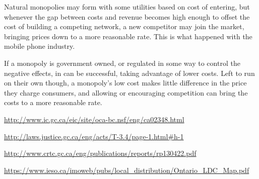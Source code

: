 \documentclass{article}
\begin{document}
Natural monopolies may form with some utilities based on cost of entering, but whenever the gap between costs and revenue becomes high enough to offset the cost of building a competing network, a new competitor may join the market, bringing prices down to a more reasonable rate. This is what happened with the mobile phone industry.

If a monopoly is government owned, or regulated in some way to control the negative effects, in can be successful, taking advantage of lower costs. Left to run on their own though, a monopoly's low cost makes little difference in the price they charge consumers, and allowing or encouraging competition can bring the costs to a more reasonable rate.

\url{http://www.ic.gc.ca/eic/site/oca-bc.nsf/eng/ca02348.html}


\url{http://laws.justice.gc.ca/eng/acts/T-3.4/page-1.html#h-1}

\url{http://www.crtc.gc.ca/eng/publications/reports/rp130422.pdf}

\url{https://www.ieso.ca/imoweb/pubs/local_distribution/Ontario_LDC_Map.pdf}






\end{document}
